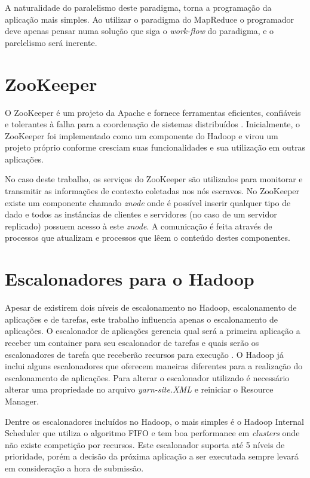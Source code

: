 A naturalidade do paralelismo deste paradigma, torna a programação da aplicação mais simples. Ao utilizar o paradigma do MapReduce o programador deve apenas pensar numa solução que siga o \textit{work-flow} do paradigma, e o parelelismo será inerente.

\section{ZooKeeper}
O ZooKeeper é um projeto da Apache e fornece ferramentas eficientes, confiáveis e tolerantes à falha para a coordenação de sistemas distribuídos \cite{Hunt2010}. Inicialmente, o ZooKeeper foi implementado como um componente do Hadoop e virou um projeto próprio conforme cresciam suas funcionalidades e sua utilização em outras aplicações. 

No caso deste trabalho, os serviços do ZooKeeper são utilizados para monitorar e transmitir as informações de contexto coletadas nos nós escravos. No ZooKeeper existe um componente chamado \textit{znode} onde é possível inserir qualquer tipo de dado e todos as instâncias de clientes e servidores (no caso de um servidor replicado) possuem acesso à este \textit{znode}. A comunicação é feita através de processos que atualizam e processos que lêem o conteúdo destes componentes.



\section{Escalonadores para o Hadoop}
\label{sec:HadSched}
Apesar de existirem dois níveis de escalonamento no Hadoop, escalonamento de aplicações e de tarefas, este trabalho influencia apenas o escalonamento de aplicações. O escalonador de aplicações gerencia qual será a primeira aplicação a receber um container para seu escalonador de tarefas e quais serão os escalonadores de tarefa que receberão recursos para execução \cite{BookHadoop}. O Hadoop já inclui alguns escalonadores que oferecem maneiras diferentes para a realização do escalonamento de aplicações. Para alterar o escalonador utilizado é necessário alterar uma propriedade no arquivo \textit{yarn-site.XML} e reiniciar o Resource Manager.

Dentre os escalonadores incluídos no Hadoop, o mais simples é o Hadoop Internal Scheduler que utiliza o algoritmo FIFO e tem boa performance em \textit{clusters} onde não existe competição por recursos. Este escalonador suporta até 5 níveis de prioridade, porém a decisão da próxima aplicação a ser executada sempre levará em consideração a hora de submissão.


